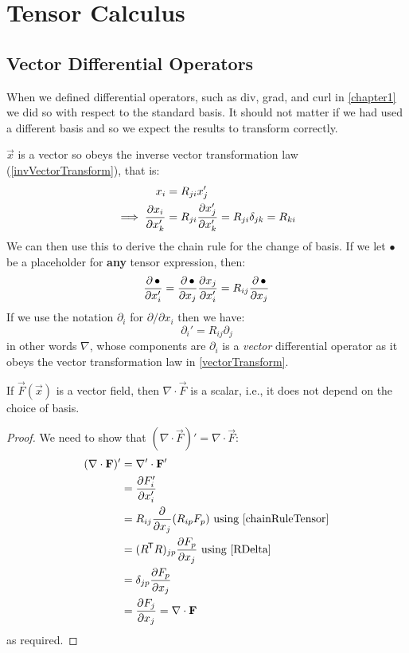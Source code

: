 \documentclass[../main.tex]{subfiles}
\begin{document}
\section{Tensor Calculus}
\subsection{Vector Differential Operators}
When we defined differential operators, such as div, grad, and curl in \cref{chapter1} we did so with respect to the standard basis.
It should not matter if we had used a different basis and so we expect the results to transform correctly.

$\vec{x}$ is a vector so obeys the inverse vector transformation law (\cref{invVectorTransform}), that is:
\begin{align*}
  x_i &= R_{j i}x_j' \\
  \implies \pderiv{x_i}{x_k'} &= R_{j i} \pderiv{x_j'}{x_k'} = R_{j i} \delta_{j k} = R_{k i}
\end{align*}
We can then use this to derive the chain rule for the change of basis.
If we let $\bullet$ be a placeholder for \textbf{any} tensor expression, then:
\begin{equation}
  \pderiv{\,\bullet}{x_i'} = \pderiv{\,\bullet}{x_j} \pderiv{x_j}{x_i'} = R_{i j} \pderiv{\,\bullet}{x_j} \label{chainRuleTensor}
\end{equation}
If we use the notation $\partial_i$ for $\partial/\partial x_i$ then we have:
\[
  \partial_i' = R_{i j}\partial_j
\]
in other words $\nabla$, whose components are $\partial_i$ is a \textit{vector} differential operator as it obeys the vector transformation law in \cref{vectorTransform}.
\begin{lemma}
  If $\vec{F}(\vec{x})$ is a vector field, then $\nabla \cdot \vec{F}$ is a scalar, i.e., it does not depend on the choice of basis.
\end{lemma}
\begin{proof}
  We need to show that $(\nabla \cdot \vec{F})' = \nabla \cdot \vec{F}$:
  \begin{align*}
    (\nabla \cdot \vec{F})' &= \nabla' \cdot \vec{F}' \\
                            &= \pderiv{F_i'}{x_i'} \\
                            &= R_{i j}\pderiv{}{x_j}(R_{i p}F_p) \text{ using \cref{chainRuleTensor}} \\
                            &= (R^{\trans} R)_{j p} \pderiv{F_p}{x_j} \text{ using \cref{RDelta}} \\
                            &= \delta_{j p} \pderiv{F_p}{x_j} \\
                            &= \pderiv{F_j}{x_j} = \nabla \cdot \vec{F}
  \end{align*}
  as required.
\end{proof}
\end{document}
